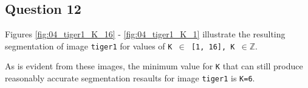 \subsection{Question 12}

Figures \ref{fig:04_tiger1_K_16} - \ref{fig:04_tiger1_K_1} illustrate the
resulting segmentation of image \texttt{tiger1} for values of
\texttt{K $\in$ [1, 16], K $\in \mathbb{Z}$}.

As is evident from these images, the minimum value for \texttt{K} that can still
produce reasonably accurate segmentation resaults for image \texttt{tiger1} is
\texttt{K=6}.


\noindent{}

